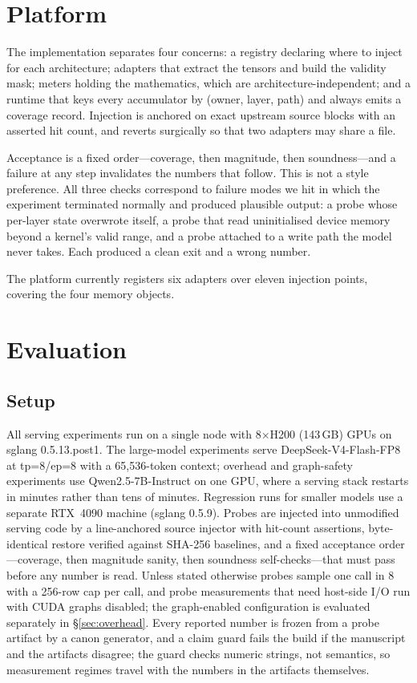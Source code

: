 \documentclass[11pt]{article}
\begin{document}
\section{Platform}
\label{sec:platform}
The implementation separates four concerns: a registry declaring where to inject for
each architecture; adapters that extract the tensors and build the validity mask;
meters holding the mathematics, which are architecture-independent; and a runtime
that keys every accumulator by (owner, layer, path) and always emits a coverage
record. Injection is anchored on exact upstream source blocks with an asserted hit
count, and reverts surgically so that two adapters may share a file.

Acceptance is a fixed order---coverage, then magnitude, then soundness---and a
failure at any step invalidates the numbers that follow. This is not a style
preference. All three checks correspond to failure modes we hit in which the
experiment terminated normally and produced plausible output: a probe whose
per-layer state overwrote itself, a probe that read uninitialised device memory
beyond a kernel's valid range, and a probe attached to a write path the model never
takes. Each produced a clean exit and a wrong number.

The platform currently registers six adapters over eleven injection points, covering
the four memory objects.

\section{Evaluation}
\label{sec:eval}

\subsection{Setup}
All serving experiments run on a single node with 8$\times$H200 (143\,GB) GPUs on
sglang 0.5.13.post1. The large-model experiments serve DeepSeek-V4-Flash-FP8 at
tp=8/ep=8 with a 65{,}536-token context; overhead and graph-safety experiments use
Qwen2.5-7B-Instruct on one GPU, where a serving stack restarts in minutes rather
than tens of minutes. Regression runs for smaller models use a separate RTX~4090
machine (sglang 0.5.9). Probes are injected into unmodified serving code by a
line-anchored source injector with hit-count assertions, byte-identical restore
verified against SHA-256 baselines, and a fixed acceptance order---coverage, then
magnitude sanity, then soundness self-checks---that must pass before any number is
read. Unless stated otherwise probes sample one call in $8$ with a 256-row cap per
call, and probe measurements that need host-side I/O run with CUDA graphs disabled;
the graph-enabled configuration is evaluated separately in
\S\ref{sec:overhead}. Every reported number is frozen from a probe artifact by a
canon generator, and a claim guard fails the build if the manuscript and the
artifacts disagree; the guard checks numeric strings, not semantics, so measurement regimes
travel with the numbers in the artifacts themselves.
\end{document}
